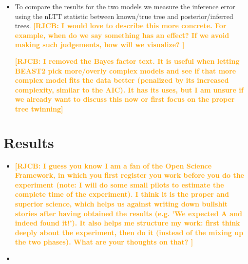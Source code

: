 \documentclass{article}
\newcommand*\richel[1]{\textcolor{orange}{\textbf{[RJCB: #1]}}}
\begin{document}
\begin{itemize}
\item To compare the results for the two models we measure the inference error using the nLTT statistic between known/true tree and posterior/inferred trees.
\richel{
  I would love to describe this more concrete. For example, when do
  we say something has an effect? If we avoid making such judgements,
  how will we visualize?
}

\richel{I removed the Bayes factor text. It is useful when letting BEAST2
pick more/overly complex models and see if that more complex model fits the
data better (penalized by its increased complexity, similar to the AIC). It has
its uses, but I am unsure if we already want to discuss this now
or first focus on the proper tree twinning}



\end{itemize}

\section{Results}
\begin{itemize}

\item
\richel{
  I guess you know I am a fan of the Open Science Framework,
  in which you first register you work before you do the experiment
  (note: I will do some small pilots to estimate the complete time
  of the experiment). I think it is the proper and superior science,
  which helps us against writing down bullshit stories after having
  obtained the results (e.g. 'We expected A and indeed found it!').
  It also helps me structure my work: first think
  deeply about the experiment, then do it (instead of the mixing
  up the two phases). What are your thoughts on that?
}

\item

\end{itemize}




\appendix


\end{document}
